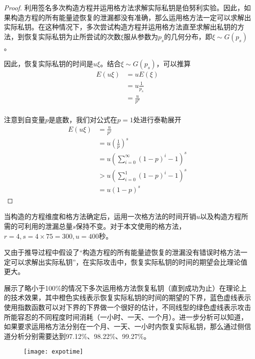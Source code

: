 {\begin{proof}
		利用签名多次构造方程并运用格方法求解实际私钥是伯努利实验。因此，如果构造方程的所有能量迹恢复的泄漏都没有准确，那么运用格方法一定可以求解出实际私钥。在这种情况下，多次尝试构造方程并运用格方法直至求解出私钥的方法，到恢复实际私钥为止所尝试的次数$\xi$服从参数为$p_s$的几何分布，即$\xi\sim G(p_s)$。
		
		因此，恢复实际私钥的时间是$u\xi$。结合$\xi\sim G(p_s)$，可以推算\begin{align*}
		E(u\xi)&=uE(\xi)\\
		&=u\frac{1}{p_s}\\
		&=\frac{u}{p^s}\\
		\end{align*}
		
		注意到自变量$p$是底数，我们对公式在$p=1$处进行泰勒展开\begin{align*}
		E(u\xi)&=\frac{u}{p^s}\\
		&=u\left( \frac1p\right) ^s\\
		&=u\left( \sum\limits_{i=0}^{\infty}\left( 1-p\right) ^i-1\right) ^s\\
		&>u\left( \sum\limits_{i=0}^{1}\left( 1-p\right) ^i-1\right) ^s\\
		&=u\left( 1-p\right) ^s
		\end{align*}
		
	\end{proof}
	当构造的方程维度和格方法确定后，运用一次格方法的时间开销$u$以及构造方程所需的可利用的泄漏总量$s$保持不变。对于本文使用的格方法，$r=4,s=4\times75=300,u=400$秒。%
	
	又由于推导过程中假设了“构造方程的所有能量迹恢复的泄漏没有错误时格方法一定可以求解出实际私钥”，在实际攻击中，恢复实际私钥的时间的期望会比理论值更大。
	
	展示了\zyx 略小于100\%的情况下多次运用格方法恢复私钥（直到成功为止）在理论上的技术效果，其中橙色实线表示恢复实际私钥的时间的期望的下界，蓝色虚线表示使用指数函数可以对下界的下界做一个很好的估计，不同线型的绿色虚线表示攻击所能容忍的不同程度时间消耗（一小时、一天、一个月）。进一步分析可以知道，如果要求运用格方法分别在一个月、一天、一小时内恢复实际私钥，那么通过侧信道分析\zyx 分别需要达到97.12\%、98.22\%、99.27\%。
	
	\begin{figure}[!h]
		\begin{center}
			\texttt{[image: expotime]}
			\label{fig:expotime}
		\end{center}
	\end{figure}

}
